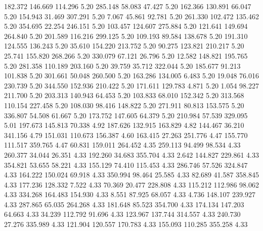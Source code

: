  182.372  146.669  114.296         5.20
 285.148   58.083   47.427         5.20
 162.366  130.891   66.047         5.20
 154.943   31.469  307.291         5.20
   7.067   45.861   92.781         5.20
 261.330  102.472  135.462         5.20
 354.695   22.254  246.151         5.20
 103.457  124.607  275.884         5.20
 121.641  149.694  264.840         5.20
 201.589  116.216  299.125         5.20
 109.193   89.584  138.678         5.20
 191.310  124.555  136.243         5.20
  35.610  154.220  213.752         5.20
  90.275  123.821  210.217         5.20
  25.741  155.820  268.266         5.20
 330.079   67.121   26.796         5.20
  12.582  148.821  195.765         5.20
 281.358  110.189  203.160         5.20
  39.759   35.712  322.044         5.20
 185.677   91.213  101.838         5.20
 301.661   50.048  260.500         5.20
 163.286  134.005    6.483         5.20
  19.048   76.016  230.739         5.20
 344.550  152.936  210.422         5.20
 171.611  129.783    4.871         5.20
   1.054   98.227  211.700         5.20
 203.313  140.943   64.453         5.20
 103.833   68.010  152.342         5.20
 313.568  110.154  227.458         5.20
 108.030   98.416  148.822         5.20
 271.911   80.813  153.575         5.20
 336.807   54.508   61.667         5.20
 173.752  147.605   64.379         5.20
 210.984   57.539  329.095         5.01
 197.673  145.813   70.338         4.92
 187.626  132.915  163.829         4.82
 144.467   36.210  341.156         4.79
 151.031  110.673  156.387         4.60
 163.415   27.263  251.776         4.47
 155.770  111.517  359.765         4.47
  60.831  159.011  264.452         4.35
 259.113   94.499   98.534         4.33
 260.377   34.044   26.351         4.33
 192.260   34.683  355.704         4.33
   2.642  144.827  229.861         4.33
 354.821   53.655   58.221         4.33
 155.129   74.410  115.453         4.33
 286.746   57.526  324.847         4.33
 164.222  150.024   69.918         4.33
 350.994   98.464   25.585         4.33
  82.689   41.587  358.845         4.33
 177.236  128.332    7.522         4.33
  70.369   20.477  228.808         4.33
 115.212  112.986   98.062         4.33
 334.268  164.483  154.930         4.33
   8.551   87.925   68.057         4.33
   4.736  148.107  239.927         4.33
 287.865   65.035  264.268         4.33
 181.648   85.523  354.700         4.33
 174.134  147.203   64.663         4.33
  34.239  112.792   91.696         4.33
 123.967  137.744  314.557         4.33
 240.730   27.276  335.989         4.33
 121.904  120.557  170.783         4.33
 155.093  110.285  355.258         4.33
